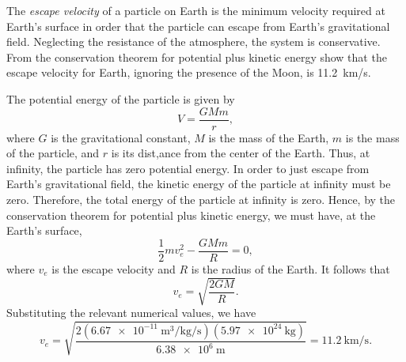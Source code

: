 \begin{questions}
\begin{solution}
\end{solution}

\question The \emph{escape velocity} of a particle on Earth is the minimum velocity required at Earth's surface in order that the particle can escape from Earth's gravitational field. Neglecting the resistance of the atmosphere, the system is conservative. From the conservation theorem for potential plus kinetic energy show that the escape velocity for Earth, ignoring the presence of the Moon, is \SI{11.2}{\km/\s}.
\begin{solution}
The potential energy of the particle is given by
\[
V = \frac{G M m}{r},
\]
where $G$ is the gravitational constant, $M$ is the mass of the Earth, $m$ is the mass of the particle, and $r$ is its dist,ance from the center of the Earth. Thus, at infinity, the particle has zero potential energy. In order to just escape from Earth's gravitational field, the kinetic energy of the particle at infinity must be zero. Therefore, the total energy of the particle at infinity is zero. Hence, by the conservation theorem for potential plus kinetic energy, we must have, at the Earth's surface,
\[
\frac{1}{2} m v_e^2 - \frac{G M m}{R} = 0,
\]
where $v_e$ is the escape velocity and $R$ is the radius of the Earth. It follows that
\[
v_e = \sqrt{\frac{2 G M}{R}}.
\]
Substituting the relevant numerical values, we have
\[
v_e = \sqrt{\frac{2 ( \SI{6.67e-11}{\cubic\m\per\kg\per\s} ) ( \SI{5.97e24}{\kg} )}{\SI{6.38e6}{\m}}} = \SI{11.2}{\km/\s}.
\]
\end{solution}


\end{questions}
